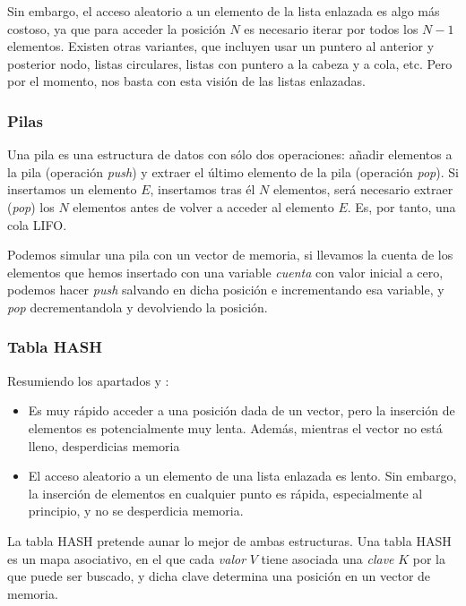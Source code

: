 Sin embargo, el acceso aleatorio a un elemento de la lista enlazada es algo más costoso, ya que para acceder la 
posición $N$ es necesario iterar por todos los $N-1$ elementos. Existen otras variantes, que incluyen usar un puntero 
al anterior y posterior nodo, listas circulares, listas con puntero a la cabeza y a cola, etc. Pero por el momento, nos 
basta con esta visión de las listas enlazadas.


\subsubsection{Pilas}
Una pila es una estructura de datos con sólo dos operaciones: añadir elementos a la pila (operación \emph{push}) y 
extraer el último elemento de la pila (operación \emph{pop}). Si insertamos un elemento $E$, insertamos tras él $N$ 
elementos, será necesario extraer (\emph{pop}) los $N$ elementos antes de volver a acceder al elemento $E$. Es, por 
tanto, una cola \gls{LIFO}.

Podemos simular una pila con un vector de memoria, si llevamos la cuenta de los elementos que hemos insertado con una 
variable \emph{cuenta} con valor inicial a cero, podemos hacer \emph{push} salvando en dicha posición e incrementando 
esa variable, y \emph{pop} decrementandola y devolviendo la posición.

\subsubsection{Tabla HASH}
Resumiendo los apartados  y :
\begin{itemize}
 \item Es muy rápido acceder a una posición dada de un vector, pero la inserción de elementos es potencialmente muy 
lenta. Además, mientras el vector no está lleno, desperdicias memoria
 \item El acceso aleatorio a un elemento de una lista enlazada es lento. Sin embargo, la inserción de elementos en 
cualquier punto es rápida, especialmente al principio, y no se desperdicia memoria.
\end{itemize}

La tabla HASH pretende aunar lo mejor de ambas estructuras. Una tabla HASH es un mapa asociativo, en el que cada 
\emph{valor} $V$ tiene asociada una \emph{clave} $K$ por la que puede ser buscado, y dicha clave determina una posición 
en un vector de memoria.

